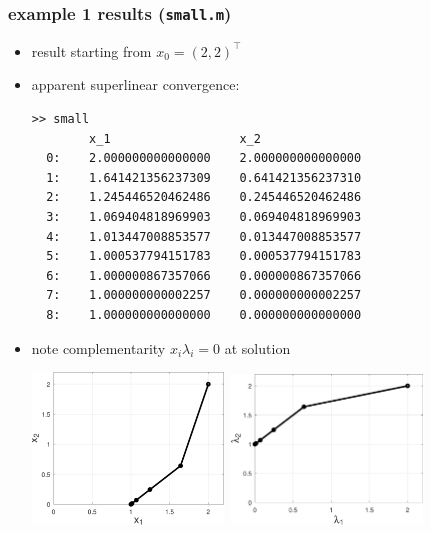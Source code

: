 \documentclass[10pt,hyperref,dvipsnames]{beamer}
\begin{document}
\begin{frame}[fragile]
\frametitle{example 1 results (\texttt{small.m})}

\begin{itemize}
\item result starting from $x_0=(2,2)^\top$
\item apparent superlinear convergence:
\begin{Verbatim}[fontsize=\scriptsize]
>> small
        x_1                  x_2
  0:    2.000000000000000    2.000000000000000
  1:    1.641421356237309    0.641421356237310
  2:    1.245446520462486    0.245446520462486
  3:    1.069404818969903    0.069404818969903
  4:    1.013447008853577    0.013447008853577
  5:    1.000537794151783    0.000537794151783
  6:    1.000000867357066    0.000000867357066
  7:    1.000000000002257    0.000000000002257
  8:    1.000000000000000    0.000000000000000
\end{Verbatim}

\item note complementarity $x_i\lambda_i=0$ at solution

\medskip
\hfill
\mbox{\includegraphics[width=0.4\textwidth]{figs/small.pdf} \qquad \includegraphics[width=0.4\textwidth]{figs/smalldual.pdf}}
\end{itemize}
\end{frame}
\end{document}
